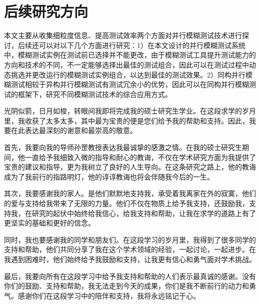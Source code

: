 \documentclass[master]{thesis-uestc}
\begin{document}
\section{后续研究方向}

本文主要从收集细粒度信息、提高测试效率两个方面对并行模糊测试技术进行探讨，后续还可以对以下几个方面进行研究：1）在本文设计的并行模糊测试系统中，模糊测试实例在测试前已选择并不能更改，由于模糊测试工具提升测试能力的方向和技术的不同，不一定能够选择出最佳的测试组合，因此可以在测试过程中动态挑选并更改运行的模糊测试实例组合，以达到最佳的测试效果。2）同构并行模糊测试相较于异构并行模糊测试有测试冗余小的优势，因此可以在同构并行模糊测试的框架下，研究不同模糊测试技术的综合应用方式。

\thesisacknowledgement

光阴似箭，日月如梭，转眼间我即将完成我的硕士研究生学业。在这段求学的岁月里，我收获了太多太多，其中最为宝贵的便是您们给予我的帮助和支持。因此，我要在此表达最深刻的谢意和最崇高的敬意。

首先，我要向我的导师孙罡教授表达我最诚挚的感激之情。在我的硕士研究生期间，他一直给予我细致入微的指导和耐心的教诲，不仅在学术研究方面为我提供了宝贵的建议和指导，更为我树立了良好的人生导向。在这条研究之路上，他的教诲成为了我前行的指路明灯，他的谆谆教诲也将会伴随我今后的一生。

其次，我要感谢我的家人。是他们默默地支持我，承受着我离家在外的寂寞，他们的爱与支持给我带来了无限的力量。他们不仅在物质上给予我支持，还鼓励我，支持我，在研究的起伏中始终给我信心，给我支持和帮助，让我在求学的道路上有了更坚实的基础和更好的信念。

同时，我也要感谢我的同学和朋友们。在这段学习的岁月里，我得到了很多同学的支持和帮助，他们共同分享了我在这个学术领域的经验，一起讨论，一起进步。在我遇到困难时，他们始终给予我鼓励和支持，让我更有信心和勇气面对学术挑战。

最后，我要向所有在这段学习中给予我支持和帮助的人们表示最真诚的感谢。没有你们的鼓励、支持和帮助，我无法走到今天的成果，你们是我不断前行的动力和勇气。感谢你们在这段学习中的陪伴和支持，我将永远铭记于心。

\end{document}
